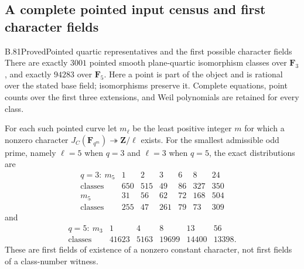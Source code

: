 \subsection{A complete pointed input census and first character fields}

\begin{claim}{B.81}{Proved}{Pointed quartic representatives and the first possible character fields}
There are exactly $3001$ pointed smooth plane-quartic isomorphism
classes over $\mathbf F _3$, and exactly $94283$ over $\mathbf F _5$.
Here a point is part of the object and is rational over the stated
base field; isomorphisms preserve it. Complete equations, point
counts over the first three extensions, and Weil polynomials are
retained for every class.

For each such pointed curve let $m_\ell$ be the least positive
integer $m$ for which a nonzero character
$J_C(\mathbf F _{q^m})\twoheadrightarrow\mathbf Z/\ell$ exists.
For the smallest admissible odd prime, namely $\ell=5$ when $q=3$
and $\ell=3$ when $q=5$, the exact distributions are
\[
\begin{array}{c|rrrrrr}
q=3:\ m_5&1&2&3&6&8&24\\ \hline
\text{classes}&650&515&49&86&327&350\\[2pt]
m_5&31&56&62&72&168&504\\ \hline
\text{classes}&255&47&261&79&73&309
\end{array}
\]
and
\[
\begin{array}{c|rrrrr}
q=5:\ m_3&1&4&8&13&56\\ \hline
\text{classes}&41623&5163&19699&14400&13398.
\end{array}
\]
These are first fields of existence of a nonzero constant character,
not first fields of a class-number witness.
\end{claim}

